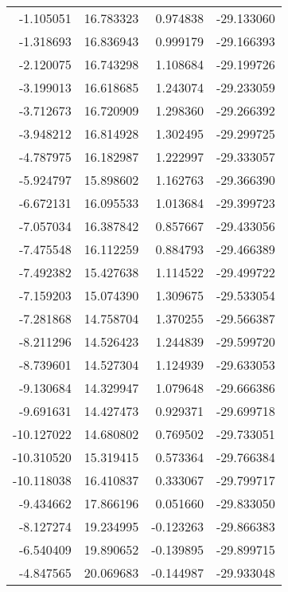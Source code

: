 \begin{tabular}{rrrr}
       -1.105051 &        16.783323 &    0.974838 & -29.133060 \\
       -1.318693 &        16.836943 &    0.999179 & -29.166393 \\
       -2.120075 &        16.743298 &    1.108684 & -29.199726 \\
       -3.199013 &        16.618685 &    1.243074 & -29.233059 \\
       -3.712673 &        16.720909 &    1.298360 & -29.266392 \\
       -3.948212 &        16.814928 &    1.302495 & -29.299725 \\
       -4.787975 &        16.182987 &    1.222997 & -29.333057 \\
       -5.924797 &        15.898602 &    1.162763 & -29.366390 \\
       -6.672131 &        16.095533 &    1.013684 & -29.399723 \\
       -7.057034 &        16.387842 &    0.857667 & -29.433056 \\
       -7.475548 &        16.112259 &    0.884793 & -29.466389 \\
       -7.492382 &        15.427638 &    1.114522 & -29.499722 \\
       -7.159203 &        15.074390 &    1.309675 & -29.533054 \\
       -7.281868 &        14.758704 &    1.370255 & -29.566387 \\
       -8.211296 &        14.526423 &    1.244839 & -29.599720 \\
       -8.739601 &        14.527304 &    1.124939 & -29.633053 \\
       -9.130684 &        14.329947 &    1.079648 & -29.666386 \\
       -9.691631 &        14.427473 &    0.929371 & -29.699718 \\
      -10.127022 &        14.680802 &    0.769502 & -29.733051 \\
      -10.310520 &        15.319415 &    0.573364 & -29.766384 \\
      -10.118038 &        16.410837 &    0.333067 & -29.799717 \\
       -9.434662 &        17.866196 &    0.051660 & -29.833050 \\
       -8.127274 &        19.234995 &   -0.123263 & -29.866383 \\
       -6.540409 &        19.890652 &   -0.139895 & -29.899715 \\
       -4.847565 &        20.069683 &   -0.144987 & -29.933048 \\

\end{tabular}
